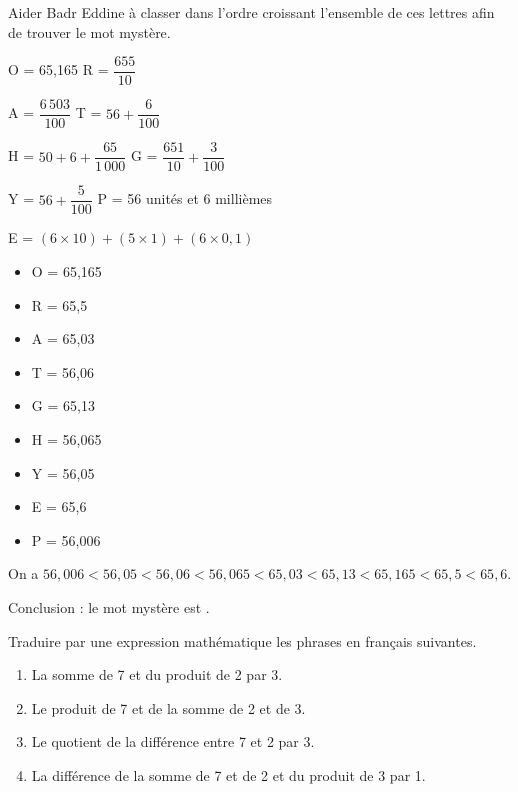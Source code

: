 \begin{Maquette}[Fiche,CorrigeFin,Colonnes=2]{}
\begin{multicols}{2}
      
      \begin{exercice}[Dur] %
         Aider Badr Eddine à classer dans l'ordre croissant l'ensemble de ces lettres afin de trouver le mot mystère. \par \smallskip
         O = 65,165 \hfill R = $\dfrac{655}{10}$ \par \smallskip
         A = $\dfrac{6\,503}{100}$ \hfill T = $56+\dfrac{6}{100}$ \par \smallskip
         H = $50+6+\dfrac{65}{1\,000}$ \hfill G = $\dfrac{651}{10}+\dfrac{3}{100}$ \par \smallskip
         Y = $56+\dfrac{5}{100}$ \hfill P = 56 unités et 6 millièmes \par \smallskip
          E = $(6\times10)+(5\times1)+(6\times0,1)$
      \end{exercice}

      \begin{Solution}
         \begin{multicols}{2}
            \begin{itemize}
               \item O = 65,165
               \item R = 65,5
               \item A = 65,03
               \item T = 56,06
               \item G = 65,13
               \item H = 56,065
               \item Y = 56,05
               \item E = 65,6
               \item P = 56,006
            \end{itemize}
         \end{multicols}
         On a $56,006 < 56,05 < 56,06 < 56,065 < 65,03 < 65,13 < 65,165 < 65,5 < 65,6$. \par
         Conclusion : le mot mystère est .
      \end{Solution}
            
      
      \begin{exercice} %
         Traduire par une expression mathématique les phrases en français suivantes.
         \begin{enumerate}
            \item La somme de 7 et du produit de 2 par 3.
            \item Le produit de 7 et de la somme de 2 et de 3.
            \item Le quotient de la différence entre 7 et 2 par 3.
            \item La différence de la somme de 7 et de 2 et du produit de 3 par 1.
         \end{enumerate}
      \end{exercice}


\end{multicols}
\end{Maquette}
